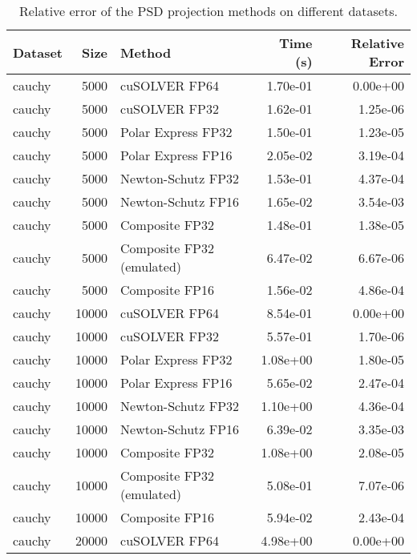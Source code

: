 \begin{table}
\centering
\caption{Relative error of the PSD projection methods on different datasets.}
\label{tab:benchmark_error}
\begin{tabular}{lrlrr}
\toprule
  Dataset &  Size &                    Method &  Time (s) &  Relative Error \\
\midrule
   cauchy &  5000 &             cuSOLVER FP64 &  1.70e-01 &        0.00e+00 \\
   cauchy &  5000 &             cuSOLVER FP32 &  1.62e-01 &        1.25e-06 \\
   cauchy &  5000 &        Polar Express FP32 &  1.50e-01 &        1.23e-05 \\
   cauchy &  5000 &        Polar Express FP16 &  2.05e-02 &        3.19e-04 \\
   cauchy &  5000 &        Newton-Schutz FP32 &  1.53e-01 &        4.37e-04 \\
   cauchy &  5000 &        Newton-Schutz FP16 &  1.65e-02 &        3.54e-03 \\
   cauchy &  5000 &            Composite FP32 &  1.48e-01 &        1.38e-05 \\
   cauchy &  5000 & Composite FP32 (emulated) &  6.47e-02 &        6.67e-06 \\
   cauchy &  5000 &            Composite FP16 &  1.56e-02 &        4.86e-04 \\
   cauchy & 10000 &             cuSOLVER FP64 &  8.54e-01 &        0.00e+00 \\
   cauchy & 10000 &             cuSOLVER FP32 &  5.57e-01 &        1.70e-06 \\
   cauchy & 10000 &        Polar Express FP32 &  1.08e+00 &        1.80e-05 \\
   cauchy & 10000 &        Polar Express FP16 &  5.65e-02 &        2.47e-04 \\
   cauchy & 10000 &        Newton-Schutz FP32 &  1.10e+00 &        4.36e-04 \\
   cauchy & 10000 &        Newton-Schutz FP16 &  6.39e-02 &        3.35e-03 \\
   cauchy & 10000 &            Composite FP32 &  1.08e+00 &        2.08e-05 \\
   cauchy & 10000 & Composite FP32 (emulated) &  5.08e-01 &        7.07e-06 \\
   cauchy & 10000 &            Composite FP16 &  5.94e-02 &        2.43e-04 \\
   cauchy & 20000 &             cuSOLVER FP64 &  4.98e+00 &        0.00e+00 \\

\end{tabular}
\end{table}
